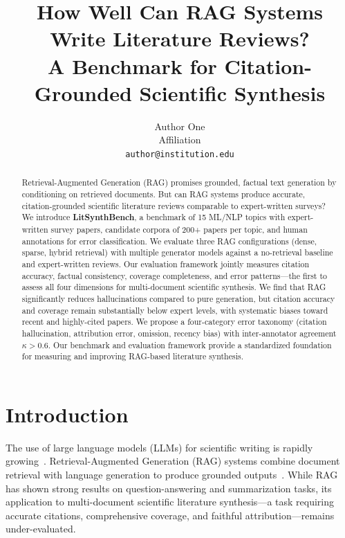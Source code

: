 \documentclass{article}
\title{How Well Can RAG Systems Write Literature Reviews?\\A Benchmark for Citation-Grounded Scientific Synthesis}
\author{
  Author One \\
  Affiliation \\
  \texttt{author@institution.edu}
}
\begin{document}
\maketitle

\begin{abstract}
Retrieval-Augmented Generation (RAG) promises grounded, factual text generation
by conditioning on retrieved documents. But can RAG systems produce accurate,
citation-grounded scientific literature reviews comparable to expert-written
surveys? We introduce \textbf{LitSynthBench}, a benchmark of 15 ML/NLP topics
with expert-written survey papers, candidate corpora of 200+ papers per topic,
and human annotations for error classification. We evaluate three RAG
configurations (dense, sparse, hybrid retrieval) with multiple generator models
against a no-retrieval baseline and expert-written reviews. Our evaluation
framework jointly measures citation accuracy, factual consistency, coverage
completeness, and error patterns---the first to assess all four dimensions for
multi-document scientific synthesis. We find that RAG significantly reduces
hallucinations compared to pure generation, but citation accuracy and coverage
remain substantially below expert levels, with systematic biases toward recent
and highly-cited papers. We propose a four-category error taxonomy (citation
hallucination, attribution error, omission, recency bias) with inter-annotator
agreement $\kappa > 0.6$. Our benchmark and evaluation framework provide a
standardized foundation for measuring and improving RAG-based literature
synthesis.
\end{abstract}

\section{Introduction}

The use of large language models (LLMs) for scientific writing is rapidly
growing~\cite{gao2024rag_survey}. Retrieval-Augmented Generation (RAG) systems
combine document retrieval with language generation to produce grounded
outputs~\cite{lewis2020rag}. While RAG has shown strong results on
question-answering and summarization tasks, its application to multi-document
scientific literature synthesis---a task requiring accurate citations,
comprehensive coverage, and faithful attribution---remains under-evaluated.
\end{document}

